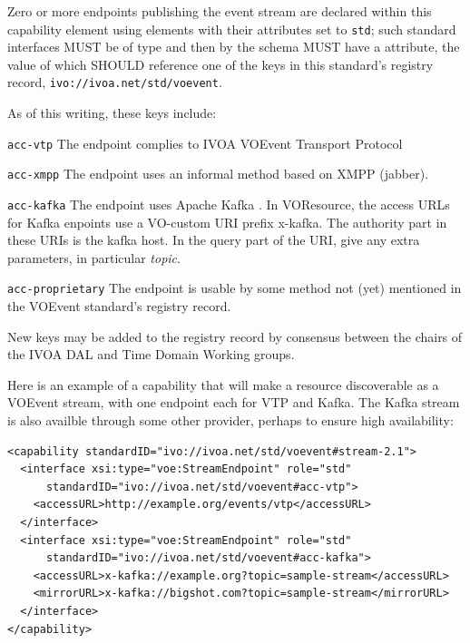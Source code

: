 \documentclass[11pt,a4paper]{ivoa}
\begin{document}
Zero or more endpoints publishing the event stream are declared within
this capability element using  elements with their
 attributes set to \verb|std|; such standard interfaces MUST
be of type  and then by the schema MUST have
a  attribute, the value of which SHOULD reference one
of the keys in this standard's registry record,
\nolinkurl{ivo://ivoa.net/std/voevent}.

As of this writing, these keys include:

\begin{compactitem}
\item  \verb|acc-vtp| The endpoint complies to IVOA VOEvent Transport
  Protocol \citep{2017ivoa.spec.0320S}
\item \verb|acc-xmpp| The endpoint uses an informal method based on
    	XMPP (jabber).
\item \verb|acc-kafka| The endpoint uses Apache Kafka \citep{kafka}.  In
VOResource, the access URLs for Kafka enpoints use a VO-custom URI
prefix x-kafka.  The authority part in these URIs is the kafka host. In
the query part of the URI, give any extra parameters, in particular
\emph{topic}.

\item \verb|acc-proprietary| The endpoint is usable by some
  method not (yet) mentioned in the VOEvent standard's registry record.
\end{compactitem}

New keys may be added to the registry record by consensus between the
chairs of the IVOA DAL and Time Domain Working groups.

Here is an example of a capability that will make a resource
discoverable as a VOEvent stream, with one endpoint each for VTP and
Kafka.  The Kafka stream is also availble through some other
provider, perhaps to ensure high availability:

\begin{lstlisting}
<capability standardID="ivo://ivoa.net/std/voevent#stream-2.1">
  <interface xsi:type="voe:StreamEndpoint" role="std"
      standardID="ivo://ivoa.net/std/voevent#acc-vtp">
    <accessURL>http://example.org/events/vtp</accessURL>
  </interface>
  <interface xsi:type="voe:StreamEndpoint" role="std"
      standardID="ivo://ivoa.net/std/voevent#acc-kafka">
    <accessURL>x-kafka://example.org?topic=sample-stream</accessURL>
    <mirrorURL>x-kafka://bigshot.com?topic=sample-stream</mirrorURL>
  </interface>
</capability>
\end{lstlisting}
\end{document}

